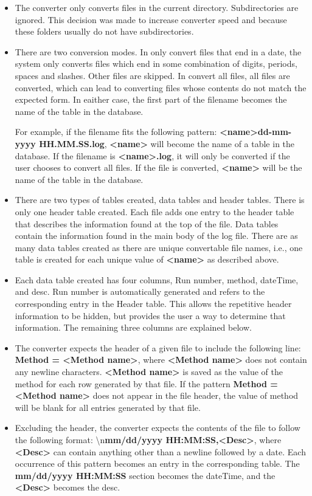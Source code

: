 \documentclass[letterpaper,11pt,twoside,final]{article}
\begin{document}
\begin{itemize}
  \item The converter only converts files in the current
directory. Subdirectories are ignored. This decision was made to
increase converter speed and because these folders usually
do not have subdirectories. 
  \item There are two conversion modes. In only convert files that end
    in a date, the system only converts files which end in some
    combination of digits, periods, spaces and slashes. Other files
    are skipped. In convert all files, all files are converted, which
    can lead to converting files whose contents do not match the
    expected form. In eaither case, the first part of the filename
    becomes the name of the table in the database.

    For example, if the filename fits the following pattern:
    \textbf{<name>dd-mm-yyyy HH.MM.SS.log},
    \textbf{<name>} will
    become the name of a table in the database. If the filename is
    \textbf{<name>.log}, it will only be converted if the user chooses
    to convert all files. If the file is converted, \textbf{<name>}
    will be the name of the table in the database.
  \item There are two types of tables created, data tables and header
    tables. There is only one header table created. Each file adds one
    entry to the header table that describes the information found at
    the top of the file. Data tables contain the information
    found in the main body of the log file. There are as many data
    tables created as there are unique convertable file names, i.e., one
    table is created for each unique value of \textbf{<name>} as
    described above.
    \item
    Each data table created has four columns, Run number, method, dateTime, and
    desc. Run number is automatically generated and refers to the
    corresponding entry in the Header table. This allows the
    repetitive header information to be hidden, but provides the user
    a way to determine that information. The remaining three columns
    are explained below.
  \item The converter expects the header of a given file to include
    the following line: \textbf{Method = <Method name>}, where
    \textbf{<Method name>} does not contain any newline characters. \textbf{<Method name>} is
    saved as the value of the method for each row generated by that
    file. If the pattern \textbf{Method = <Method name>} does not
    appear in the file header, the value of method will be blank for
    all entries generated by that file.
  \item Excluding the header, the converter expects the contents of
    the file to follow the following format: \textbackslash n\textbf{mm/dd/yyyy HH:MM:SS,<Desc>}, where \textbf{<Desc>} can
    contain anything other than a newline followed by a date. Each
    occurrence of this pattern becomes an entry in the corresponding
    table. The \textbf{mm/dd/yyyy HH:MM:SS} section becomes the dateTime, and
    the \textbf{<Desc>} becomes the desc.
\end{itemize}
\end{document}
